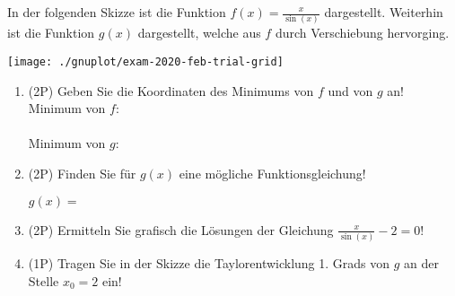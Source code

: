In der folgenden Skizze ist die Funktion $f(x)=\frac{x}{\sin(x)}$ dargestellt. Weiterhin ist die Funktion $g(x)$ dargestellt, welche aus $f$ durch Verschiebung hervorging.

\begin{center}
	\texttt{[image: ./gnuplot/exam-2020-feb-trial-grid]}
\end{center}

\begin{enumerate}[label=(\alph*)]
\item (2P) Geben Sie die Koordinaten des Minimums von $f$ und von $g$ an!\\

Minimum von $f$:\\
\bigskip\\
Minimum von $g$:\\
\bigskip
\bigskip

\item (2P) Finden Sie für $g(x)$ eine mögliche Funktionsgleichung!

\bigskip
\bigskip

$g(x)=$

\bigskip
\bigskip
\bigskip

\item (2P) Ermitteln Sie grafisch die Lösungen der Gleichung $\frac{x}{\sin(x)}-2=0$!

\bigskip
\bigskip
\bigskip
\bigskip
\bigskip
\bigskip

\item (1P) Tragen Sie in der Skizze die Taylorentwicklung 1. Grads von $g$ an der Stelle $x_0=2$ ein!

\end {enumerate}
